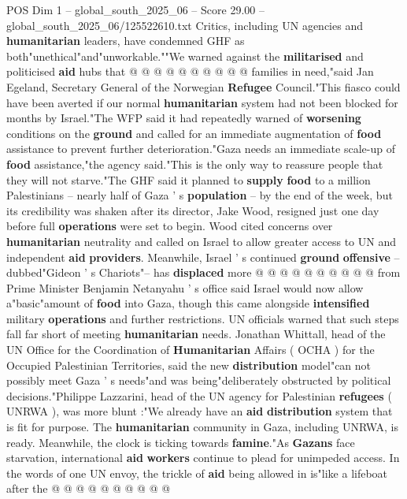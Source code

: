 \begin{textsample}{POS Dim 1 – global\_south\_2025\_06 – Score 29.00 – global\_south\_2025\_06/125522610.txt}
Critics, including UN agencies and \textbf{humanitarian} leaders, have condemned GHF as both"unethical"and"unworkable.""We warned against the \textbf{militarised} and politicised \textbf{aid} hubs that @ @ @ @ @ @ @ @ @ @ families in need,"said Jan Egeland, Secretary General of the Norwegian \textbf{Refugee} Council."This fiasco could have been averted if our normal \textbf{humanitarian} system had not been blocked for months by Israel."The WFP said it had repeatedly warned of \textbf{worsening} conditions on the \textbf{ground} and called for an immediate augmentation of \textbf{food} assistance to prevent further deterioration."Gaza needs an immediate scale-up of \textbf{food} assistance,"the agency said."This is the only way to reassure people that they will not starve."The GHF said it planned to \textbf{supply} \textbf{food} to a million Palestinians -- nearly half of Gaza ' s \textbf{population} -- by the end of the week, but its credibility was shaken after its director, Jake Wood, resigned just one day before full \textbf{operations} were set to begin.
Wood cited concerns over \textbf{humanitarian} neutrality and called on Israel to allow greater access to UN and independent \textbf{aid} \textbf{providers}.
Meanwhile, Israel ' s continued \textbf{ground} \textbf{offensive} -- dubbed"Gideon ' s Chariots"-- has \textbf{displaced} more @ @ @ @ @ @ @ @ @ @ from Prime Minister Benjamin Netanyahu ' s office said Israel would now allow a"basic"amount of \textbf{food} into Gaza, though this came alongside \textbf{intensified} military \textbf{operations} and further restrictions.
UN officials warned that such steps fall far short of meeting \textbf{humanitarian} needs.
Jonathan Whittall, head of the UN Office for the Coordination of \textbf{Humanitarian} Affairs ( OCHA ) for the Occupied Palestinian Territories, said the new \textbf{distribution} model"can not possibly meet Gaza ' s needs"and was being"deliberately obstructed by political decisions."Philippe Lazzarini, head of the UN agency for Palestinian \textbf{refugees} ( UNRWA ), was more blunt :"We already have an \textbf{aid} \textbf{distribution} system that is fit for purpose.
The \textbf{humanitarian} community in Gaza, including UNRWA, is ready.
Meanwhile, the clock is ticking towards \textbf{famine}."As \textbf{Gazans} face starvation, international \textbf{aid} \textbf{workers} continue to plead for unimpeded access.
In the words of one UN envoy, the trickle of \textbf{aid} being allowed in is"like a lifeboat after the @ @ @ @ @ @ @ @ @ @

\end{textsample}
